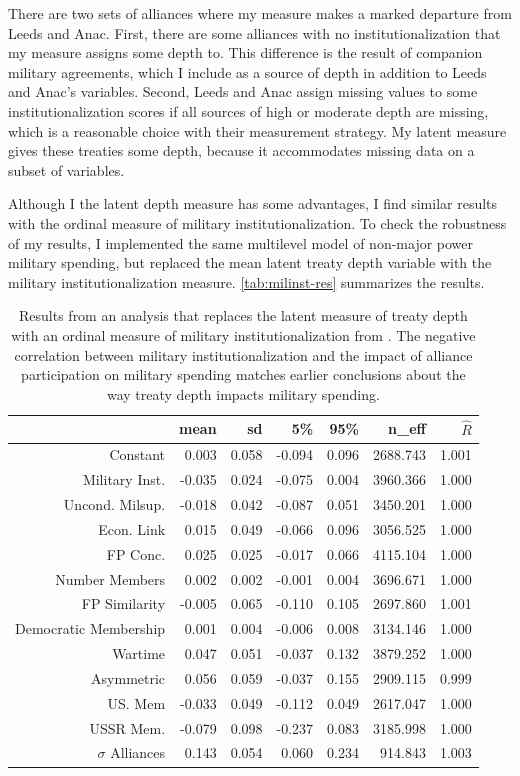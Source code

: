 \documentclass[12pt]{article}
\begin{document}
There are two sets of alliances where my measure makes a marked departure from Leeds and Anac. 
First, there are some alliances with no institutionalization that my measure assigns some depth to. 
This difference is the result of companion military agreements, which I include as a source of depth in addition to Leeds and Anac's variables. 
Second, Leeds and Anac assign missing values to some institutionalization scores if all sources of high or moderate depth are missing, which is a reasonable choice with their measurement strategy.
My latent measure gives these treaties some depth, because it accommodates missing data on a subset of variables. 


Although I the latent depth measure has some advantages, I find similar results with the ordinal measure of military institutionalization. 
To check the robustness of my results, I implemented the same multilevel model of non-major power military spending, but replaced the mean latent treaty depth variable with the military institutionalization measure. 
\autoref{tab:milinst-res} summarizes the results. 


\begin{table}[ht]
\centering
\begin{tabular}{rrrrrrr}
  \hline
 & mean & sd & 5\% & 95\% & n\_eff & $\hat{R}$ \\ 
  \hline
Constant & 0.003 & 0.058 & -0.094 & 0.096 & 2688.743 & 1.001 \\ 
  Military Inst. & -0.035 & 0.024 & -0.075 & 0.004 & 3960.366 & 1.000 \\ 
  Uncond. Milsup. & -0.018 & 0.042 & -0.087 & 0.051 & 3450.201 & 1.000 \\ 
  Econ. Link & 0.015 & 0.049 & -0.066 & 0.096 & 3056.525 & 1.000 \\ 
  FP Conc. & 0.025 & 0.025 & -0.017 & 0.066 & 4115.104 & 1.000 \\ 
  Number Members & 0.002 & 0.002 & -0.001 & 0.004 & 3696.671 & 1.000 \\ 
  FP Similarity & -0.005 & 0.065 & -0.110 & 0.105 & 2697.860 & 1.001 \\ 
  Democratic Membership & 0.001 & 0.004 & -0.006 & 0.008 & 3134.146 & 1.000 \\ 
  Wartime & 0.047 & 0.051 & -0.037 & 0.132 & 3879.252 & 1.000 \\ 
  Asymmetric & 0.056 & 0.059 & -0.037 & 0.155 & 2909.115 & 0.999 \\ 
  US. Mem & -0.033 & 0.049 & -0.112 & 0.049 & 2617.047 & 1.000 \\ 
  USSR Mem. & -0.079 & 0.098 & -0.237 & 0.083 & 3185.998 & 1.000 \\ 
  $\sigma$ Alliances & 0.143 & 0.054 & 0.060 & 0.234 & 914.843 & 1.003 \\ 
   \hline
\end{tabular}
\caption{Results from an analysis that replaces the latent measure of treaty depth with an ordinal measure of military institutionalization from \citet{LeedsAnac2005}. The negative correlation between military institutionalization and the impact of alliance participation on military spending matches earlier conclusions about the way treaty depth impacts military spending.}
\label{tab:milinst-res}
\end{table}
\end{document}
